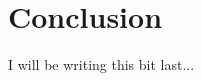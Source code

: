 \chapter{Conclusion}\label{ch:conclusion}
\minitoc
\onehalfspace   %

I will be writing this bit last...


